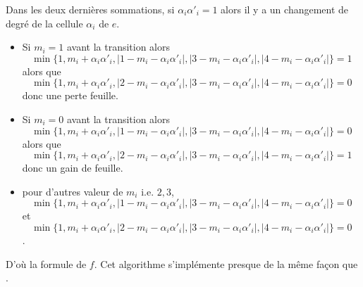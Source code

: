  Dans les deux dernières sommations, si $\alpha_{i}\alpha'_{i}=1$ alors il y a un changement de degré de la cellule $\alpha_{i}$ de $e$.
 \begin{itemize}
 \item Si $m_{i}=1$ avant la transition alors 
 $$\min\{1,m_{i} +\alpha_{i}\alpha'_{i},\vert 1-m_{i}-\alpha_{i}\alpha'_{i}\vert, \vert 3-m_{i}-\alpha_{i}\alpha'_{i}\vert,\vert 4-m_{i}-\alpha_{i}\alpha'_{i}\vert\}=1$$ alors que 
 $$\min\{1,m_{i} +\alpha_{i}\alpha'_{i},\vert 2-m_{i}-\alpha_{i}\alpha'_{i}\vert, \vert 3-m_{i}-\alpha_{i}\alpha'_{i}\vert,\vert 4-m_{i}-\alpha_{i}\alpha'_{i}\vert\}=0$$ donc une perte feuille.
 \item Si $m_{i}=0$ avant la transition alors 
 $$\min\{1,m_{i} +\alpha_{i}\alpha'_{i},\vert 1-m_{i}-\alpha_{i}\alpha'_{i}\vert, \vert 3-m_{i}-\alpha_{i}\alpha'_{i}\vert,\vert 4-m_{i}-\alpha_{i}\alpha'_{i}\vert\}=0$$ alors que 
 $$\min\{1,m_{i} +\alpha_{i}\alpha'_{i},\vert 2-m_{i}-\alpha_{i}\alpha'_{i}\vert, \vert 3-m_{i}-\alpha_{i}\alpha'_{i}\vert,\vert 4-m_{i}-\alpha_{i}\alpha'_{i}\vert\}=1$$ donc un gain de feuille.
\item pour d'autres valeur de $m_{i}$ i.e. $2,3$, 
$$\min\{1,m_{i} +\alpha_{i}\alpha'_{i},\vert 1-m_{i}-\alpha_{i}\alpha'_{i}\vert, \vert 3-m_{i}-\alpha_{i}\alpha'_{i}\vert,\vert 4-m_{i}-\alpha_{i}\alpha'_{i}\vert\}=0$$ et
 $$\min\{1,m_{i} +\alpha_{i}\alpha'_{i},\vert 2-m_{i}-\alpha_{i}\alpha'_{i}\vert, \vert 3-m_{i}-\alpha_{i}\alpha'_{i}\vert,\vert 4-m_{i}-\alpha_{i}\alpha'_{i}\vert\}=0$$.
 \end{itemize}
 D'où la formule de $f$. Cet algorithme s'implémente presque de la même façon que .
 
